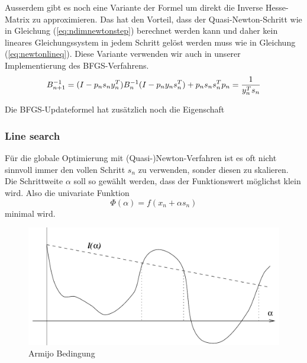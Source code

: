 \documentclass[runningheads,a4paper]{llncs}
\begin{document}
Ausserdem gibt es noch eine Variante der Formel um direkt die Inverse Hesse-Matrix zu approximieren. Das hat den Vorteil, dass der Quasi-Newton-Schritt wie in Gleichung (\ref{eq:ndimnewtonstep}) berechnet werden kann und daher kein lineares Gleichungssystem in jedem Schritt gelöst werden muss wie in Gleichung (\ref{eq:newtonlineq}). Diese Variante verwenden wir auch in unserer Implementierung des BFGS-Verfahrens.
\begin{equation}
\label{eq:bfgsinverse}
B_{n+1}^{-1} = (I - p_n s_n y_n^T) B_n^{-1} (I - p_n y_n s_n^T) + p_n s_n s_n^T \\ p_n = \frac{1}{y_n^Ts_n}
\end{equation}

Die BFGS-Updateformel hat zusätzlich noch die Eigenschaft 

\subsubsection{Line search}

Für die globale Optimierung mit (Quasi-)Newton-Verfahren ist es oft nicht sinnvoll immer den vollen Schritt $s_n$ zu verwenden, sonder diesen zu skalieren. Die Schrittweite $\alpha$ soll so gewählt werden, dass der Funktionswert möglichst klein wird. Also die univariate Funktion
\begin{equation*}
\Phi(\alpha) = f(x_n + \alpha s_n)
\end{equation*}
minimal wird.

\begin{figure}[ht]
 \centering
 \includegraphics[scale=0.25]{armijo}
 \caption{Armijo Bedingung \cite{nocedal1999numerical}}
 \label{img:armijo}
\end{figure}
\end{document}
